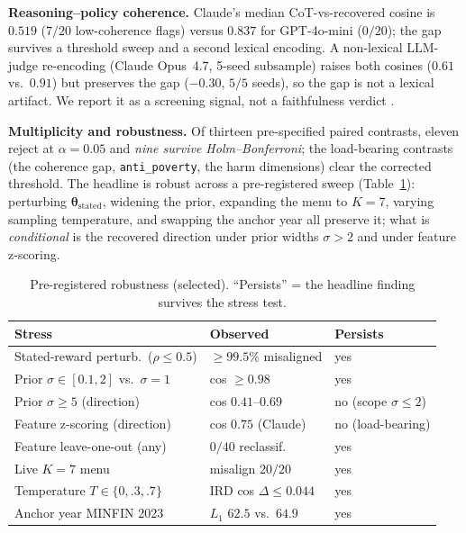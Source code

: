\documentclass[conference]{IEEEtran}
\begin{document}
\textbf{Reasoning--policy coherence.} Claude's median CoT-vs-recovered
cosine is $0.519$ ($7/20$ low-coherence flags) versus $0.837$ for
GPT-4o-mini ($0/20$); the gap survives a threshold sweep and a second
lexical encoding. A non-lexical LLM-judge re-encoding (Claude Opus~4.7,
5-seed subsample) raises both cosines ($0.61$ vs.\ $0.91$) but preserves
the gap ($-0.30$, $5/5$ seeds), so the gap is not a lexical artifact. We
report it as a screening signal, not a faithfulness verdict
\cite{hubinger2024}.

\textbf{Multiplicity and robustness.} Of thirteen pre-specified paired
contrasts, eleven reject at $\alpha{=}0.05$ and \emph{nine survive
Holm--Bonferroni}; the load-bearing contrasts (the coherence gap,
\texttt{anti\_poverty}, the harm dimensions) clear the corrected
threshold. The headline is robust across a pre-registered sweep
(Table~\ref{tab:robust}): perturbing $\boldsymbol{\theta}_{\text{stated}}$,
widening the prior, expanding the menu to $K{=}7$, varying sampling
temperature, and swapping the anchor year all preserve it; what is
\emph{conditional} is the recovered direction under prior widths
$\sigma>2$ and under feature z-scoring.

\begin{table}[t]
\centering
\caption{Pre-registered robustness (selected). ``Persists'' = the
headline finding survives the stress test.}
\label{tab:robust}
\begin{tabular}{lll}
\toprule
Stress & Observed & Persists \\
\midrule
Stated-reward perturb.\ ($\rho{\le}0.5$) & $\ge99.5\%$ misaligned & yes \\
Prior $\sigma\in[0.1,2]$ vs.\ $\sigma{=}1$ & cos $\ge0.98$ & yes \\
Prior $\sigma\ge5$ (direction) & cos $0.41$--$0.69$ & no (scope $\sigma\!\le\!2$) \\
Feature z-scoring (direction) & cos $0.75$ (Claude) & no (load-bearing) \\
Feature leave-one-out (any) & $0/40$ reclassif. & yes \\
Live $K{=}7$ menu & misalign $20/20$ & yes \\
Temperature $T\in\{0,.3,.7\}$ & IRD cos $\Delta{\le}0.044$ & yes \\
Anchor year MINFIN 2023 & $L_1$ $62.5$ vs.\ $64.9$ & yes \\
\bottomrule
\end{tabular}
\end{table}

\end{document}

